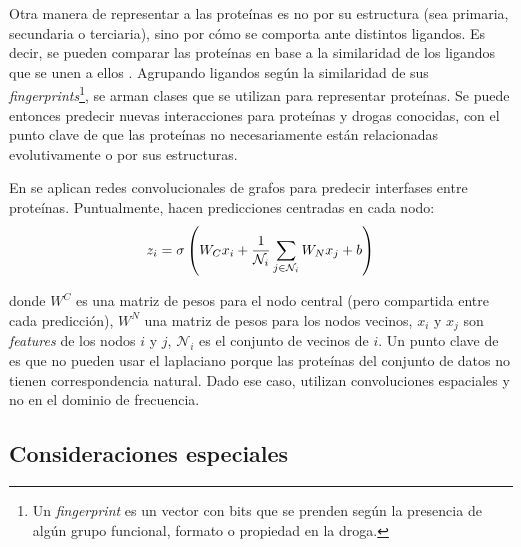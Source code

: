 \documentclass[
    left=2.0cm,         %
    right=2.0cm,        %
    top=2.0cm,          %
    bottom=2.5cm,         %
    bindingoffset=6mm,  %
    nohyphenation=false %
]{eiti/eiti-thesis}
\begin{document}
Otra manera de representar a las proteínas es no por su estructura (sea primaria,
secundaria o terciaria), sino por cómo se comporta ante distintos ligandos. Es decir,
se pueden comparar las proteínas en base a la similaridad de los ligandos que se
unen a ellos \cite{keiser2009newtargetsknowndrugs} \cite{keiserhert2008relatingdrugclasses}.
Agrupando ligandos según la similaridad de sus \textit{fingerprints}\footnote{Un \textit{fingerprint}
es un vector con bits que se prenden según la presencia de algún grupo funcional, formato o
propiedad en la droga.}, se arman 
clases que se utilizan para representar proteínas. Se puede entonces predecir
nuevas interacciones para proteínas y drogas conocidas, con el punto clave de que
las proteínas no necesariamente están relacionadas evolutivamente o por sus
estructuras.

En \cite{fout2017proteininterface} se aplican redes convolucionales de grafos para
predecir interfases entre proteínas. Puntualmente, hacen predicciones centradas en
cada nodo:
\begin{equation*}
    \LARGE
    z_i = \sigma\left ( W_C x_i + \frac{1}{\mathcal{N}_i} \sum_{j\in \mathcal{N}_i} W_N x_j + b \right )
\end{equation*}

donde $W^C$ es una matriz de pesos para el nodo central (pero compartida entre cada
predicción), $W^N$  una matriz de pesos para los nodos vecinos, 
$x_i$ y $x_j$ son \textit{features} de los nodos $i$ y $j$, $\mathcal{N}_i$ es el conjunto
de vecinos de $i$. Un punto clave de \cite{fout2017proteininterface} es que no pueden
usar el laplaciano porque las proteínas del conjunto de datos no tienen correspondencia
natural. Dado ese caso, utilizan convoluciones espaciales y no en el dominio de frecuencia.









\subsection{Consideraciones especiales} \label{consideraciones}
\end{document}
